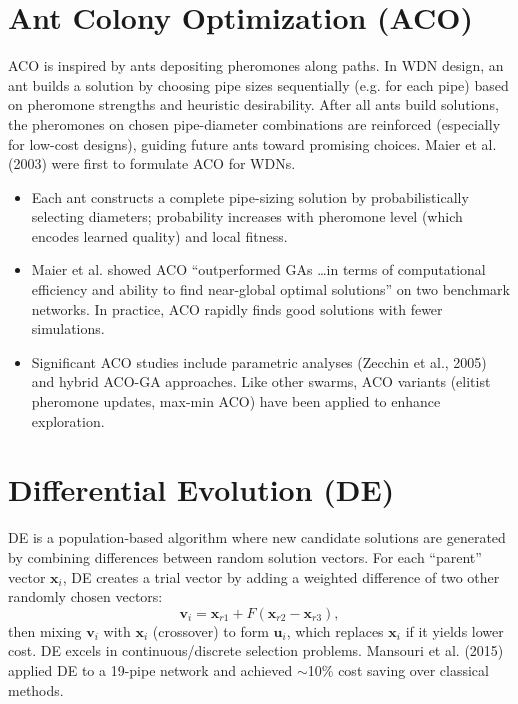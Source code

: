 \documentclass[12pt, a4paper]{article}
\begin{document}
\section*{Ant Colony Optimization (ACO)}
ACO is inspired by ants depositing pheromones along paths. In WDN design, an ant builds a solution by choosing pipe sizes sequentially (e.g. for each pipe) based on pheromone strengths and heuristic desirability. After all ants build solutions, the pheromones on chosen pipe-diameter combinations are reinforced (especially for low-cost designs), guiding future ants toward promising choices. Maier et al. (2003) were first to formulate ACO for WDNs\cite{ref6}.

\begin{itemize}
	\item Each ant constructs a complete pipe-sizing solution by probabilistically selecting diameters; probability increases with pheromone level (which encodes learned quality) and local fitness.
	\item Maier et al. showed ACO ``outperformed GAs \dots in terms of computational efficiency and ability to find near-global optimal solutions'' on two benchmark networks\cite{ref6}. In practice, ACO rapidly finds good solutions with fewer simulations.
	\item Significant ACO studies include parametric analyses (Zecchin et al., 2005) and hybrid ACO-GA approaches. Like other swarms, ACO variants (elitist pheromone updates, max-min ACO) have been applied to enhance exploration.
\end{itemize}

\section*{Differential Evolution (DE)}
DE is a population-based algorithm where new candidate solutions are generated by combining differences between random solution vectors. For each ``parent'' vector $\mathbf{x}_i$, DE creates a trial vector by adding a weighted difference of two other randomly chosen vectors:
$$\mathbf{v}_i = \mathbf{x}_{r1} + F(\mathbf{x}_{r2}-\mathbf{x}_{r3}),$$
then mixing $\mathbf{v}_i$ with $\mathbf{x}_i$ (crossover) to form $\mathbf{u}_i$, which replaces $\mathbf{x}_i$ if it yields lower cost. DE excels in continuous/discrete selection problems. Mansouri et al. (2015) applied DE to a 19-pipe network and achieved $\sim$10\% cost saving over classical methods\cite{ref7}.
\end{document}
